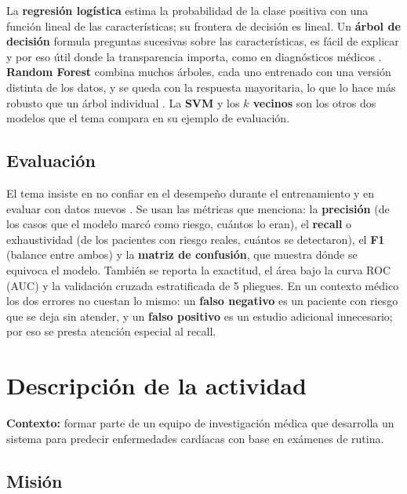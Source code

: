 \documentclass[11pt,letterpaper]{article}
\begin{document}
La \textbf{regresión logística} estima la probabilidad de la clase positiva con una función lineal de las características; su frontera de decisión es lineal. Un \textbf{árbol de decisión} formula preguntas sucesivas sobre las características, es fácil de explicar y por eso útil donde la transparencia importa, como en diagnósticos médicos \parencite{iae_u4_t43}. \textbf{Random Forest} combina muchos árboles, cada uno entrenado con una versión distinta de los datos, y se queda con la respuesta mayoritaria, lo que lo hace más robusto que un árbol individual \parencite{iae_u4_t43}. La \textbf{SVM} y los \textbf{$k$ vecinos} son los otros dos modelos que el tema compara en su ejemplo de evaluación.

\subsection{Evaluación}

El tema insiste en no confiar en el desempeño durante el entrenamiento y en evaluar con datos nuevos \parencite{iae_u4_t43}. Se usan las métricas que menciona: la \textbf{precisión} (de los casos que el modelo marcó como riesgo, cuántos lo eran), el \textbf{recall} o exhaustividad (de los pacientes con riesgo reales, cuántos se detectaron), el \textbf{F1} (balance entre ambos) y la \textbf{matriz de confusión}, que muestra dónde se equivoca el modelo. También se reporta la exactitud, el área bajo la curva ROC (AUC) y la validación cruzada estratificada de 5 pliegues. En un contexto médico los dos errores no cuestan lo mismo: un \textbf{falso negativo} es un paciente con riesgo que se deja sin atender, y un \textbf{falso positivo} es un estudio adicional innecesario; por eso se presta atención especial al recall.

\section{Descripción de la actividad}

\textbf{Contexto:} formar parte de un equipo de investigación médica que desarrolla un sistema para predecir enfermedades cardíacas con base en exámenes de rutina.

\subsection*{Misión}
\end{document}
